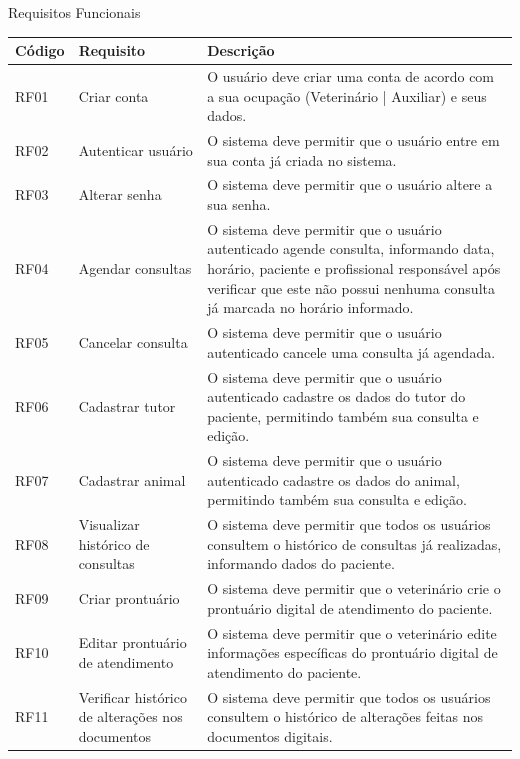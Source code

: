 \documentclass[
    12pt,               %
    openright,          %
    oneside,
    a4paper,            %
    BIBLATEX,           %
    TODO,               %
    english,            %
    brazil              %
    ]{ifsp-spo-inf-ctds}
\begin{document}
            \begin{center}
                \begin{quadro}[H]
                \caption{Requisitos Funcionais}
                \begin{tabulary}{1.0\textwidth}{|p{5em}|p{8em}|p{18em}|}
                \hline
                Código & Requisito & Descrição\\
                \hline
                RF01 & Criar conta & O usuário deve criar uma conta de acordo com a sua ocupação (Veterinário | Auxiliar) e seus dados.\\
                \hline
                RF02 & Autenticar usuário & O sistema deve permitir que o usuário entre em sua conta já criada no sistema.\\
                \hline
                RF03 & Alterar senha & O sistema deve permitir que o usuário altere a sua senha.\\
                \hline
                RF04 & Agendar consultas & O sistema deve permitir que o usuário autenticado agende consulta, informando data, horário, paciente e profissional responsável após verificar que este não possui nenhuma consulta já marcada no horário informado.\\
                \hline
                RF05 & Cancelar consulta & O sistema deve permitir que o usuário autenticado cancele uma consulta já agendada.\\
                \hline
                RF06 & Cadastrar tutor & O sistema deve permitir que o usuário autenticado cadastre os dados do tutor do paciente, permitindo também sua consulta e edição.\\
                \hline
                RF07 & Cadastrar animal & O sistema deve permitir que o usuário autenticado cadastre os dados do animal, permitindo também sua consulta e edição.\\
                \hline
                RF08 & Visualizar histórico de consultas & O sistema deve permitir que todos os usuários consultem o histórico de consultas já realizadas, informando dados do paciente.\\
                \hline
                RF09 & Criar prontuário & O sistema deve permitir que o veterinário crie o prontuário digital de atendimento do paciente.\\
                \hline
                RF10 & Editar prontuário de atendimento & O sistema deve permitir que o veterinário edite informações específicas do prontuário digital de atendimento do paciente.\\
                \hline
                RF11 & Verificar histórico de alterações nos documentos & O sistema deve permitir que todos os usuários consultem o histórico de alterações feitas nos documentos digitais.\\
                \hline
                

\end{tabulary}
\end{quadro}
\end{center}
\end{document}
